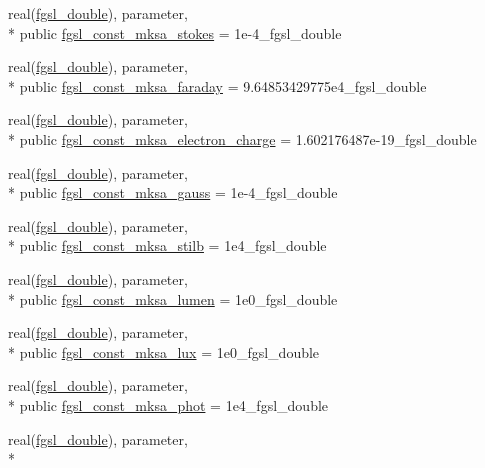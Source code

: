 \begin{DoxyCompactItemize}
\item 
real(\hyperlink{classfgsl_a9af5113378e0f000eb479d3f90196ddf}{fgsl\-\_\-double}), parameter, \\*
public \hyperlink{classfgsl_a273648685fb01a8fa87760688d2be8aa}{fgsl\-\_\-const\-\_\-mksa\-\_\-stokes} = 1e-\/4\-\_\-fgsl\-\_\-double
\item 
real(\hyperlink{classfgsl_a9af5113378e0f000eb479d3f90196ddf}{fgsl\-\_\-double}), parameter, \\*
public \hyperlink{classfgsl_a7a5c5ad37eb790e7372f127324e5fc9f}{fgsl\-\_\-const\-\_\-mksa\-\_\-faraday} = 9.\-64853429775e4\-\_\-fgsl\-\_\-double
\item 
real(\hyperlink{classfgsl_a9af5113378e0f000eb479d3f90196ddf}{fgsl\-\_\-double}), parameter, \\*
public \hyperlink{classfgsl_a5e5f274ebbe5764c7828f792b8b10b12}{fgsl\-\_\-const\-\_\-mksa\-\_\-electron\-\_\-charge} = 1.\-602176487e-\/19\-\_\-fgsl\-\_\-double
\item 
real(\hyperlink{classfgsl_a9af5113378e0f000eb479d3f90196ddf}{fgsl\-\_\-double}), parameter, \\*
public \hyperlink{classfgsl_a043539089f28355888955c6546349052}{fgsl\-\_\-const\-\_\-mksa\-\_\-gauss} = 1e-\/4\-\_\-fgsl\-\_\-double
\item 
real(\hyperlink{classfgsl_a9af5113378e0f000eb479d3f90196ddf}{fgsl\-\_\-double}), parameter, \\*
public \hyperlink{classfgsl_a744ee71f71c6df7add4526f13316e982}{fgsl\-\_\-const\-\_\-mksa\-\_\-stilb} = 1e4\-\_\-fgsl\-\_\-double
\item 
real(\hyperlink{classfgsl_a9af5113378e0f000eb479d3f90196ddf}{fgsl\-\_\-double}), parameter, \\*
public \hyperlink{classfgsl_a7bb4dd075b4ec4613ff976153a8a42dd}{fgsl\-\_\-const\-\_\-mksa\-\_\-lumen} = 1e0\-\_\-fgsl\-\_\-double
\item 
real(\hyperlink{classfgsl_a9af5113378e0f000eb479d3f90196ddf}{fgsl\-\_\-double}), parameter, \\*
public \hyperlink{classfgsl_a38e1e1db82aff58851133f55d981feed}{fgsl\-\_\-const\-\_\-mksa\-\_\-lux} = 1e0\-\_\-fgsl\-\_\-double
\item 
real(\hyperlink{classfgsl_a9af5113378e0f000eb479d3f90196ddf}{fgsl\-\_\-double}), parameter, \\*
public \hyperlink{classfgsl_aa7384fc174d5954073075ac6e8117789}{fgsl\-\_\-const\-\_\-mksa\-\_\-phot} = 1e4\-\_\-fgsl\-\_\-double
\item 
real(\hyperlink{classfgsl_a9af5113378e0f000eb479d3f90196ddf}{fgsl\-\_\-double}), parameter, \\*

\end{DoxyCompactItemize}
